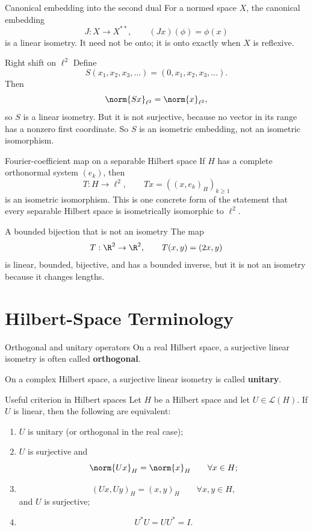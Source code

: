\documentclass[header={Ancillary Note: Isometries},notheorems]{study-note}
\begin{document}
\begin{exbox}{Canonical embedding into the second dual}
For a normed space $X$, the canonical embedding
\[
J:X\to X^{**},
\qquad
(Jx)(\phi)=\phi(x)
\]
is a linear isometry. It need not be onto; it is onto exactly when $X$ is reflexive.
\end{exbox}

\begin{exbox}{Right shift on $\ell^2$}
Define
\[
S(x_1,x_2,x_3,\dots)=(0,x_1,x_2,x_3,\dots).
\]
Then
\[
\norm{Sx}_{\ell^2}=\norm{x}_{\ell^2},
\]
so $S$ is a linear isometry. But it is not surjective, because no vector in its range has a nonzero first coordinate. So $S$ is an isometric embedding, not an isometric isomorphism.
\end{exbox}

\begin{exbox}{Fourier-coefficient map on a separable Hilbert space}
If $H$ has a complete orthonormal system $(e_k)$, then
\[
T:H\to \ell^2,
\qquad
Tx=((x,e_k)_H)_{k\ge 1}
\]
is an isometric isomorphism. This is one concrete form of the statement that every separable Hilbert space is isometrically isomorphic to $\ell^2$.
\end{exbox}

\begin{exbox}{A bounded bijection that is not an isometry}
The map
\[
T:\R^2\to\R^2,
\qquad
T(x,y)=(2x,y)
\]
is linear, bounded, bijective, and has a bounded inverse, but it is not an isometry because it changes lengths.
\end{exbox}

\section{Hilbert-Space Terminology}

\begin{defbox}{Orthogonal and unitary operators}
On a real Hilbert space, a surjective linear isometry is often called \textbf{orthogonal}.

On a complex Hilbert space, a surjective linear isometry is called \textbf{unitary}.
\end{defbox}

\begin{thmbox}{Useful criterion in Hilbert spaces}
Let $H$ be a Hilbert space and let $U\in\mathcal L(H)$. If $U$ is linear, then the following are equivalent:
\begin{enumerate}
\item $U$ is unitary (or orthogonal in the real case);
\item $U$ is surjective and
\[
\norm{Ux}_H=\norm{x}_H \qquad \forall x\in H;
\]
\item
\[
(Ux,Uy)_H=(x,y)_H \qquad \forall x,y\in H,
\]
and $U$ is surjective;
\item
\[
U^*U=UU^*=I.
\]
\end{enumerate}
\end{thmbox}
\end{document}

